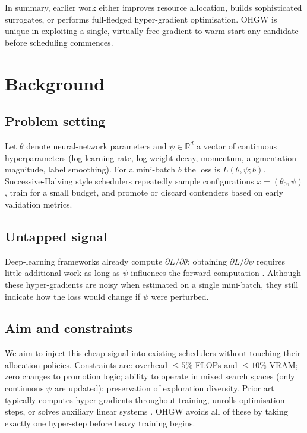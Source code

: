\documentclass{article}
\begin{document}
In summary, earlier work either improves resource allocation, builds sophisticated surrogates, or performs full-fledged hyper-gradient optimisation. OHGW is unique in exploiting a single, virtually free gradient to warm-start any candidate before scheduling commences.

\section{Background}
\subsection{Problem setting}
Let \(\theta\) denote neural-network parameters and \(\psi\in\mathbb{R}^d\) a vector of continuous hyperparameters (log learning rate, log weight decay, momentum, augmentation magnitude, label smoothing). For a mini-batch \(b\) the loss is \(L(\theta,\psi; b)\). Successive-Halving style schedulers repeatedly sample configurations \(x=(\theta_0,\psi)\), train for a small budget, and promote or discard contenders based on early validation metrics.

\subsection{Untapped signal}
Deep-learning frameworks already compute \(\partial L/\partial \theta\); obtaining \(\partial L/\partial \psi\) requires little additional work as long as \(\psi\) influences the forward computation \cite{chandra-2019-gradient}. Although these hyper-gradients are noisy when estimated on a single mini-batch, they still indicate how the loss would change if \(\psi\) were perturbed.

\subsection{Aim and constraints}
We aim to inject this cheap signal into existing schedulers without touching their allocation policies. Constraints are: overhead \(\leq 5\%\) FLOPs and \(\leq 10\%\) VRAM; zero changes to promotion logic; ability to operate in mixed search spaces (only continuous \(\psi\) are updated); preservation of exploration diversity. Prior art typically computes hyper-gradients throughout training, unrolls optimisation steps, or solves auxiliary linear systems \cite{bertrand-2020-implicit,immer-2023-stochastic}. OHGW avoids all of these by taking exactly one hyper-step before heavy training begins.
\end{document}
